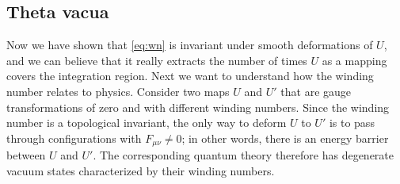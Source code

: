 \subsection{Theta vacua}
Now we have shown that \eqref{eq:wn} is invariant under smooth deformations
of $U$, and we can believe that it really extracts the number of times
$U$ as a mapping covers the integration region. Next we want to understand
how the winding number relates to physics. 
Consider two maps $U$ and $U'$ that are gauge transformations of
zero and with different winding numbers. Since the winding number
is a topological invariant, the only way to deform $U$ to $U'$ is
to pass through configurations with $F_{\mu\nu}\neq0$; in other
words, there is an energy barrier between $U$ and $U'$. 
The corresponding quantum theory therefore has degenerate
vacuum states characterized by their winding numbers.

